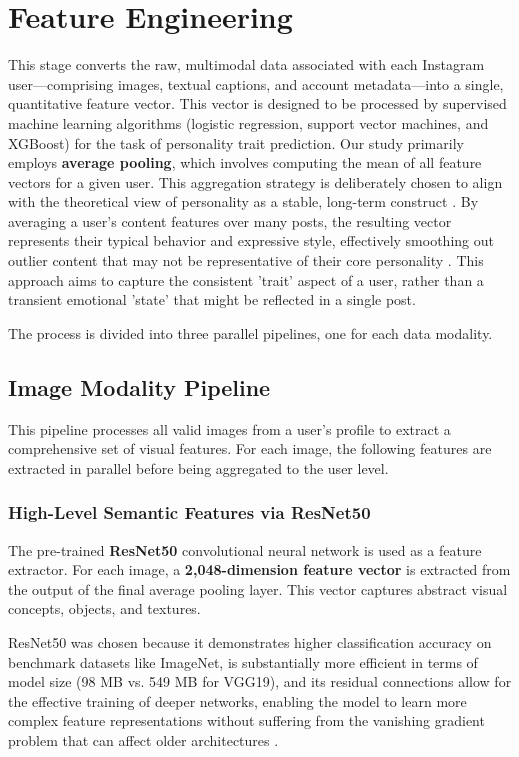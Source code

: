 \section{Feature Engineering}
\label{subsec:features}
This stage converts the raw, multimodal data associated with each Instagram user—comprising images, textual captions, and account metadata—into a single, quantitative feature vector. This vector is designed to be processed by supervised machine learning algorithms (logistic regression, support vector machines, and XGBoost) for the task of personality trait prediction. Our study primarily employs \textbf{average pooling}, which involves computing the mean of all feature vectors for a given user. This aggregation strategy is deliberately chosen to align with the theoretical view of personality as a stable, long-term construct \citep{babcock2020big}. By averaging a user's content features over many posts, the resulting vector represents their typical behavior and expressive style, effectively smoothing out outlier content that may not be representative of their core personality \citep{azucar_predicting_2018}. This approach aims to capture the consistent 'trait' aspect of a user, rather than a transient emotional 'state' that might be reflected in a single post.


The process is divided into three parallel pipelines, one for each data modality.

\subsection{Image Modality Pipeline}
This pipeline processes all valid images from a user's profile to extract a comprehensive set of visual features. For each image, the following features are extracted in parallel before being aggregated to the user level.

\subsubsection{High-Level Semantic Features via ResNet50}
The pre-trained \textbf{ResNet50} convolutional neural network is used as a feature extractor. For each image, a \textbf{2,048-dimension feature vector} is extracted from the output of the final average pooling layer. This vector captures abstract visual concepts, objects, and textures.

ResNet50 was chosen because it demonstrates higher classification accuracy on benchmark datasets like ImageNet, is substantially more efficient in terms of model size (98 MB vs. 549 MB for VGG19), and its residual connections allow for the effective training of deeper networks, enabling the model to learn more complex feature representations without suffering from the vanishing gradient problem that can affect older architectures \citep{he2015, simonyan2014very}.

